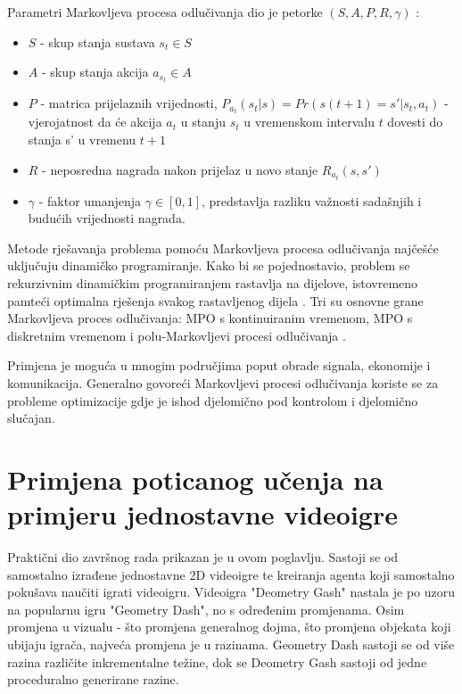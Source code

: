 \documentclass[]{foi} %
\begin{document}
Parametri Markovljeva procesa odlučivanja dio je petorke $(S, A, P, R, \gamma)$ \cite[str. 482-483]{marinescu2017cloud}:
\begin{itemize}
    \item $S$ - skup stanja sustava $s_{t} \in S$
    \item $A$ - skup stanja akcija $a_{s_{t}} \in A$
    \item $P$ - matrica prijelaznih vrijednosti, $P_{a_{t}}(s_t | s) = Pr(s(t + 1) = s'|s_t,a_t)$ - vjerojatnost da će akcija $a_t$ u stanju $s_t$ u vremenskom intervalu $t$ dovesti do stanja s' u vremenu $t + 1$ 
    \item $R$ - neposredna nagrada nakon prijelaz u novo stanje $R_{a_{t}}(s, s')$
    \item $\gamma$ - faktor umanjenja $\gamma \in [0, 1]$, predstavlja razliku važnosti sadašnjih i budućih vrijednosti nagrada.
\end{itemize}

Metode rješavanja problema pomoću Markovljeva procesa odlučivanja najčešće uključuju dinamičko programiranje. Kako bi se pojednostavio, problem se rekurzivnim dinamičkim programiranjem rastavlja na dijelove, istovremeno pamteći optimalna rješenja svakog rastavljenog dijela \cite[str. 553]{AIModernApproach}. Tri su osnovne grane Markovljeva proces odlučivanja: MPO s kontinuiranim vremenom, MPO s diskretnim vremenom i polu-Markovljevi procesi odlučivanja \cite[str. 4]{MDP}.

Primjena je moguća u mnogim područjima poput obrade signala, ekonomije i komunikacija. Generalno govoreći Markovljevi procesi odlučivanja koriste se za probleme optimizacije gdje je ishod djelomično pod kontrolom i djelomično slučajan.

\chapter{Primjena poticanog učenja na primjeru jednostavne videoigre}
\label{cha: primjena}
Praktični dio završnog rada prikazan je u ovom poglavlju. Sastoji se od samostalno izrađene jednostavne 2D videoigre te kreiranja agenta koji samostalno pokušava naučiti igrati videoigru. Videoigra "Deometry Gash" nastala je po uzoru na popularnu igru "Geometry Dash", no s određenim promjenama. Osim promjena u vizualu - što promjena generalnog dojma, što promjena objekata koji ubijaju igrača, najveća promjena je u razinama. Geometry Dash sastoji se od više razina različite inkrementalne težine, dok se Deometry Gash sastoji od jedne proceduralno generirane razine. 
\end{document}
